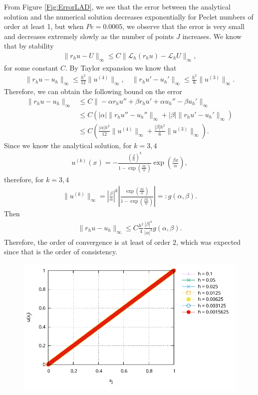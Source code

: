 \documentclass[a4paper,11pt]{article}
\theoremstyle{break}
\theoremstyle{break2}
\theoremstyle{break}
\theoremstyle{break2}
\newcommand{\cL}{\mathcal{L}}
\begin{document}
\noindent
From Figure \ref{Fig:ErrorLAD}, we see that the error between the analytical solution and the numerical solution decreases exponentially for Peclet numbers of order at least 1, but when $ Pe = 0.0005 $, we observe that the error is very small and decreases extremely slowly as the number of points $ J $ increases. We know that by stability
\begin{align*}
\|r_hu - U\|_{\infty} \leq C \|\cL_h(r_h u) - \cL_h U \|_{\infty},
\end{align*}
for some constant $ C $. By Taylor expansion we know that
\begin{align*}
\|r_h u - u_h\|_{\infty} \leq \frac{h^2}{12}\|u^{(4)}\|_{\infty},\quad \|r_hu' - u_h'\|_{\infty} \leq \frac{h^2}{6}\|u^{(3)}\|_{\infty}.
\end{align*}
Therefore, we can obtain the following bound on the error
\begin{align*}
\|r_h u - u_h\|_{\infty} &\leq C\|-\alpha r_h u'' + \beta r_h u' + \alpha u_h'' - \beta u_h'\|_{\infty} \\
&\leq C\left(|\alpha|\|r_h u'' - u_h''\|_{\infty} + |\beta|\|r_h u' - u_h' \|_{\infty}\right) \\
&\leq C\left(\frac{|\alpha|h^2}{12}\|u^{(4)}\|_{\infty} + \frac{|\beta|h^2}{6}\|u^{(3)}\|_{\infty}\right).
\end{align*}
Since we know the analytical solution, for $ k = 3,4 $
\begin{align*}
u^{(k)}(x) =-\frac{\left(\frac{\beta}{\alpha}\right)^k}{1 - \exp\left(\frac{\beta L}{\alpha}\right)}\exp\left(\frac{\beta x}{\alpha}\right),
\end{align*}
therefore, for $ k = 3,4 $
\begin{align*}
\|u^{(k)}\|_{\infty} = \left|\frac{\beta}{\alpha}\right|^{k}\left|\frac{\exp\left(\frac{\beta L}{\alpha}\right)}{1 - \exp\left(\frac{\beta L}{\alpha}\right)}\right| =: g(\alpha,\beta).
\end{align*}
Then
\begin{align*}
\|r_hu - u_h\|_{\infty} \leq C\frac{h^2}{4}\frac{|\beta|^4}{|\alpha|^3}g(\alpha,\beta).
\end{align*}
Therefore, the order of convergence is at least of order $ 2 $, which was expected since that is the order of consistency.
\begin{figure}[h!]
	\centering
	\includegraphics{Solution_plots_Pe_0.pdf}
\end{figure}
\end{document}
